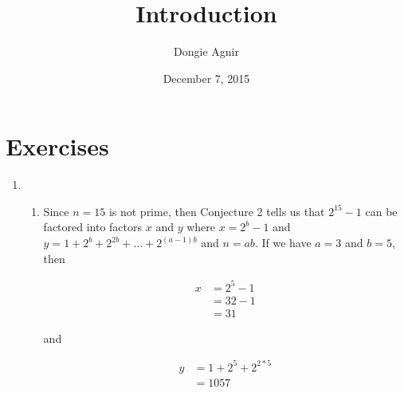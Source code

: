 \documentclass{article}
\title{Introduction}
\author{Dongie Agnir}
\date{December 7, 2015 }
\begin{document}
\maketitle

\section*{Exercises}
\begin{enumerate}
\item
  \begin{enumerate}
  \item Since $n=15$ is not prime, then Conjecture 2 tells us that $2^{15} - 1$ can be factored into factors $x$ and $y$ where $x = 2^b - 1$ and $y = 1 + 2^b + 2^{2b} + \ldots + 2^{(a-1)b}$ and $n=ab$.  If we have $a=3$ and $b=5$, then

    \begin{equation*}
      \begin{aligned}
        x &= 2^5 - 1 \\
        &= 32 - 1 \\
        &= 31
      \end{aligned}
    \end{equation*}

    and

    \begin{equation*}
      \begin{aligned}
        y &= 1 + 2^5 + 2^{2*5} \\
        &= 1057
      \end{aligned}
    \end{equation*}


\end{enumerate}
\end{enumerate}
\end{document}
